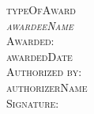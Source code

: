 \documentclass[landscape, draft]{article}
\begin{document}
\begin{center}
\Huge
\textsc{typeOfAward
\bigskip
\\\emph{awardeeName}
\bigskip
\\Awarded: 
\bigskip
\\awardedDate
\bigskip
\\Authorized by: 
\bigskip
\\authorizerName
\bigskip
\\Signature: 
}
\bigskip
\\%
\end{center}
\end{document}
